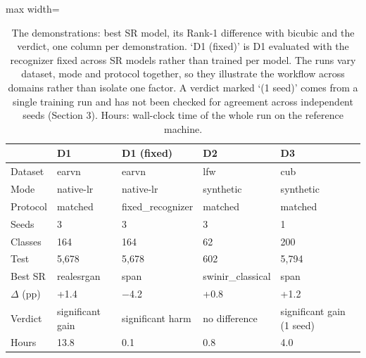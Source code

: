 \begin{table}[t]
\centering
\footnotesize
\caption{The demonstrations: best SR model, its Rank-1 difference with bicubic and the verdict, one column per demonstration. `D1 (fixed)' is D1 evaluated with the recognizer fixed across SR models rather than trained per model. The runs vary dataset, mode and protocol together, so they illustrate the workflow across domains rather than isolate one factor. A verdict marked `(1 seed)' comes from a single training run and has not been checked for agreement across independent seeds (Section 3). Hours: wall-clock time of the whole run on the reference machine.}
\label{tab:summary}
\begin{adjustbox}{max width=\linewidth}
\begin{tabular}{lllll}
\toprule
 & D1 & D1 (fixed) & D2 & D3 \\
\midrule
Dataset & earvn & earvn & lfw & cub \\
Mode & native-lr & native-lr & synthetic & synthetic \\
Protocol & matched & fixed\_recognizer & matched & matched \\
Seeds & 3 & 3 & 3 & 1 \\
Classes & 164 & 164 & 62 & 200 \\
Test & 5,678 & 5,678 & 602 & 5,794 \\
Best SR & realesrgan & span & swinir\_classical & span \\
$\Delta$ (pp) & +1.4 & $-$4.2 & +0.8 & +1.2 \\
Verdict & significant gain & significant harm & no difference & significant gain (1 seed) \\
Hours & 13.8 & 0.1 & 0.8 & 4.0 \\
\bottomrule
\end{tabular}
\end{adjustbox}
\end{table}
